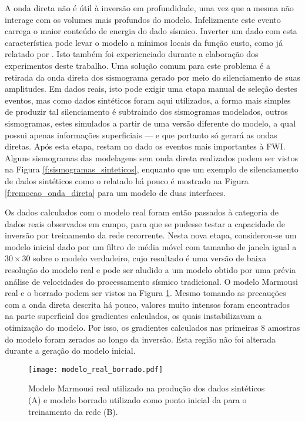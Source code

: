     A onda direta não é útil à inversão em profundidade, uma vez que a mesma não interage com os volumes mais profundos do modelo. Infelizmente este evento carrega o maior conteúdo de energia do dado sísmico. Inverter um dado com esta característica pode levar o modelo a mínimos locais da função custo, como já relatado por . Isto também foi experienciado durante a elaboração dos experimentos deste trabalho. Uma solução comum para este problema é a retirada da onda direta dos sismograma gerado por meio do silenciamento de suas amplitudes. Em dados reais, isto pode exigir uma etapa manual de seleção destes eventos, mas como dados sintéticos foram aqui utilizados, a forma mais simples de produzir tal silenciamento é subtraindo dos sismogramas modelados, outros sismogramas, estes simulados a partir de uma versão diferente do modelo, a qual possui apenas informações superficiais --- e que portanto só gerará as ondas diretas. Após esta etapa, restam no dado os eventos mais importantes à FWI. Alguns sismogramas das modelagens sem onda direta realizados podem ser vistos na Figura \ref{f:sismogramas_sinteticos}, enquanto que um exemplo de silenciamento de dados sintéticos como o relatado há pouco é mostrado na Figura \ref{f:remocao_onda_direta} para um modelo de duas interfaces.

    Os dados calculados com o modelo real foram então passados à categoria de dados reais observados em campo, para que se pudesse testar a capacidade de inversão por treinamento da rede recorrente. Nesta nova etapa, considerou-se um modelo inicial dado por um filtro de média móvel com tamanho de janela igual a $30\times30$ sobre o modelo verdadeiro, cujo resultado é uma versão de baixa resolução do modelo real e pode ser aludido a um modelo obtido por uma prévia análise de velocidades do processamento sísmico tradicional. O modelo Marmousi real e o borrado podem ser vistos na Figura \ref{f:modelo_real_borrado}. Mesmo tomando as precauções com a onda direta descrita há pouco, valores muito intensos foram encontrados na parte superficial dos gradientes calculados, os quais instabilizavam a otimização do modelo. Por isso, os gradientes calculados nas primeiras 8 amostras do modelo foram zerados ao longo da inversão. Esta região não foi alterada durante a geração do modelo inicial.

      \begin{figure}
        \begin{center}
          \texttt{[image: modelo\_real\_borrado.pdf]}
        \end{center}
        \caption{Modelo Marmousi real utilizado na produção dos dados sintéticos (A) e modelo borrado utilizado como ponto inicial da para o treinamento da rede (B).}
        \label{f:modelo_real_borrado}
      \end{figure}

